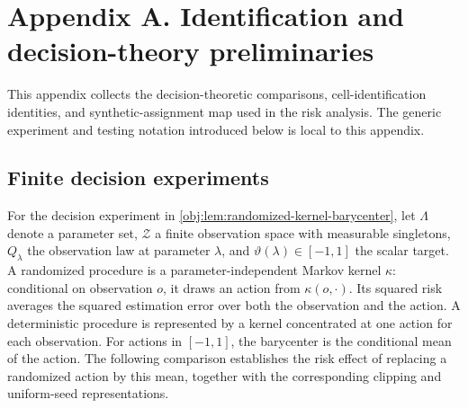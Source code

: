 \section{Appendix A. Identification and decision-theory preliminaries}

This appendix collects the decision-theoretic comparisons, cell-identification identities, and synthetic-assignment map used in the risk analysis. The generic experiment and testing notation introduced below is local to this appendix.

\subsection{Finite decision experiments}

For the decision experiment in \cref{obj:lem:randomized-kernel-barycenter}, let \(\Lambda\) denote a parameter set, \(\mathcal Z\) a finite observation space with measurable singletons, \(Q_\lambda\) the observation law at parameter \(\lambda\), and \(\vartheta(\lambda)\in[-1,1]\) the scalar target. A randomized procedure is a parameter-independent Markov kernel \(\kappa\): conditional on observation \(o\), it draws an action from \(\kappa(o,\cdot)\). Its squared risk averages the squared estimation error over both the observation and the action. A deterministic procedure is represented by a kernel concentrated at one action for each observation. For actions in \([-1,1]\), the barycenter is the conditional mean of the action. The following comparison establishes the risk effect of replacing a randomized action by this mean, together with the corresponding clipping and uniform-seed representations.


